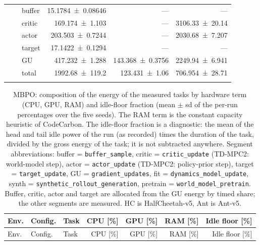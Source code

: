 {\begin{longtable}{@{}lllrrr@{}}
     &  & buffer & \num{15.1784+-0.08646} & --- & --- \\
     &  & critic & \num{169.174+-1.103} & --- & \num{3106.33+-20.14} \\
     &  & actor & \num{203.503+-0.7244} & --- & \num{2030.68+-7.207} \\
     &  & target & \num{17.1422+-0.1294} & --- & --- \\
     &  & GU & \num{417.232+-1.288} & \num{143.368+-0.3756} & \num{2249.94+-6.941} \\
     &  & total & \num{1992.68+-119.2} & \num{123.431+-1.06} & \num{706.954+-28.71} \\
    \addlinespace[2pt]
  \end{longtable}
}

{\scriptsize\setlength{\tabcolsep}{4pt}
  \begin{longtable}{@{}lllrrrr@{}}
    \caption[MBPO: composition of the energy of the measured tasks by hardware term (CPU, GPU, RAM) and idle-floor fraction (mean $\pm$ sd of the per-run percentages over the five seeds)]{MBPO: composition of the energy of the measured tasks by hardware term (CPU, GPU, RAM) and idle-floor fraction (mean $\pm$ sd of the per-run percentages over the five seeds). The RAM term is the constant capacity heuristic of CodeCarbon. The idle-floor fraction is a diagnostic: the mean of the head and tail idle power of the run (as recorded) times the duration of the task, divided by the gross energy of the task; it is not subtracted anywhere. Segment abbreviations: buffer = \texttt{buffer\_\allowbreak sample}, critic = \texttt{critic\_\allowbreak update} (TD-MPC2: world-model step), actor = \texttt{actor\_\allowbreak update} (TD-MPC2: policy-prior step), target = \texttt{target\_\allowbreak update}, GU = \texttt{gradient\_\allowbreak updates}, fit = \texttt{dynamics\_\allowbreak model\_\allowbreak update}, synth = \texttt{synthetic\_\allowbreak rollout\_\allowbreak generation}, pretrain = \texttt{world\_\allowbreak model\_\allowbreak pretrain}. Buffer, critic, actor and target are allocated from the GU energy by timed share; the other segments are measured. HC is HalfCheetah-v5, Ant is Ant-v5.}
    \label{tab:app-mbpo-comp} \\
    \toprule
    Env. & Config. & Task & CPU [\%] & GPU [\%] & RAM [\%] & Idle floor [\%] \\
    \midrule
    \endfirsthead
    \toprule
    Env. & Config. & Task & CPU [\%] & GPU [\%] & RAM [\%] & Idle floor [\%] \\
    \midrule
    \endhead

\end{longtable}}
